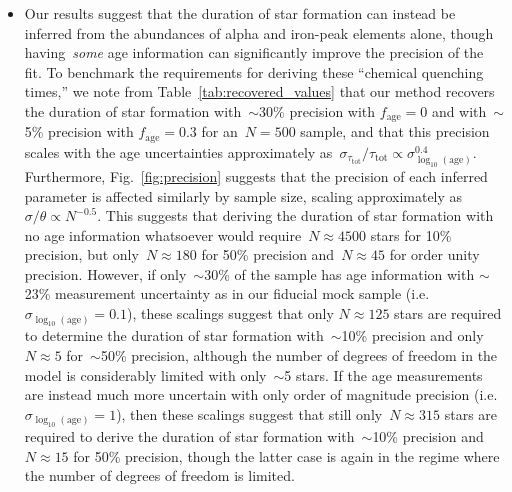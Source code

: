\documentclass[ms.tex]{subfiles}
\begin{document}
\begin{itemize}
	\item Our results suggest that the duration of star formation can instead
	be inferred from the abundances of alpha and iron-peak elements alone,
	though having~\textit{some} age information can significantly improve the
	precision of the fit.
	To benchmark the requirements for deriving these ``chemical quenching
	times,'' we note from Table~\ref{tab:recovered_values} that our method
	recovers the duration of star formation with~$\sim$30\% precision with
	$f_\text{age} = 0$ and with~$\sim$5\% precision with $f_\text{age} = 0.3$
	for an~$N = 500$ sample, and that this precision scales with the age
	uncertainties approximately as~$\sigma_{\tau_\text{tot}} / \tau_\text{tot}
	\propto \sigma_{\log_{10}(\text{age})}^{0.4}$.
	Furthermore, Fig.~\ref{fig:precision} suggests that the precision of each
	inferred parameter is affected similarly by sample size, scaling
	approximately as~$\sigma / \theta \propto N^{-0.5}$.
	This suggests that deriving the duration of star formation with no age
	information whatsoever would require~$N \approx 4500$ stars for 10\%
	precision, but only~$N \approx 180$ for 50\% precision and~$N \approx 45$
	for order unity precision.
	However, if only~$\sim$30\% of the sample has age information with
	$\sim$23\% measurement uncertainty as in our fiducial mock sample (i.e.
	$\sigma_{\log_{10}(\text{age})} = 0.1$), these scalings suggest that only
	$N \approx 125$ stars are required to determine the duration of star
	formation with~$\sim$10\% precision and only~$N \approx 5$ for~$\sim$50\%
	precision, although the number of degrees of freedom in the model is
	considerably limited with only~$\sim$5 stars.
	If the age measurements are instead much more uncertain with only order
	of magnitude precision (i.e.~$\sigma_{\log_{10}(\text{age})} = 1$), then
	these scalings suggest that still only~$N \approx 315$ stars are required
	to derive the duration of star formation with~$\sim$10\% precision and
	$N \approx 15$ for 50\% precision, though the latter case is again in the
	regime where the number of degrees of freedom is limited.



\end{itemize}
\end{document}
